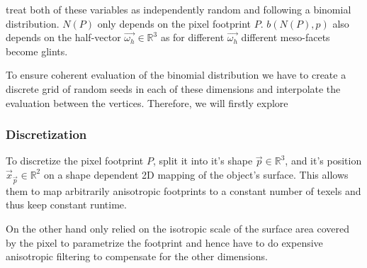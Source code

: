 \textcite{deliot2023} treat both of these variables as independently random and following a binomial distribution. $N(P)$ only depends on the pixel footprint $P$.
%
$b(N(P),p)$ also depends on the half-vector $\vec{\omega_h} \in \mathbb{R}^3$ as for different $\vec{\omega_h}$ different meso-facets become glints.


To ensure coherent evaluation of the binomial distribution we have to create a discrete grid of random seeds in each of these dimensions and interpolate the evaluation between the vertices.
%
Therefore, we will firstly explore


\subsubsection{Discretization}
\label{sec:discretization}

To discretize the pixel footprint $P$, \textcite{deliot2023} split it into it's shape $\vec{p} \in \mathbb{R}^3$, and it's position $\vec{x}_{\vec{p}} \in \mathbb{R}^2$ on a shape dependent 2D mapping of the object's surface.
%
This allows them to map arbitrarily anisotropic footprints to a constant number of texels and thus keep constant runtime.


On the other hand \textcite{zirr2016} only relied on the isotropic scale of the surface area covered by the pixel to parametrize the footprint and hence have to do expensive anisotropic filtering to compensate for the other dimensions.

